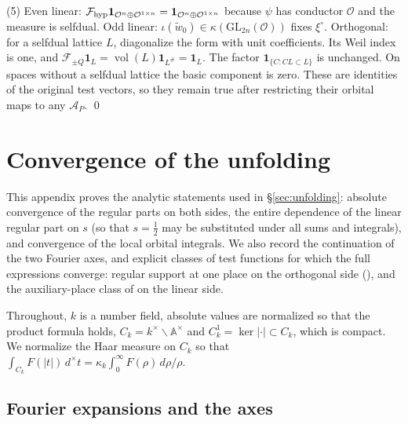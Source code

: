 \documentclass[11pt,oneside,notitlepage]{book}
\numberwithin{equation}{section}
\theoremstyle{plain}
\theoremstyle{definition}
\newcommand{\A}{\mathbb{A}}
\newcommand{\cO}{\mathcal{O}}
\newcommand{\GL}{\mathrm{GL}}
\newcommand{\vol}{\operatorname{vol}}
\newcommand{\one}{\mathbf{1}}
\begin{document}
(5) Even linear: $\mathcal F_{\rm hyp}\one_{\cO^n\oplus\cO^{1\times n}}=\one_{\cO^n\oplus\cO^{1\times n}}$ because $\psi$ has conductor $\cO$ and the measure is selfdual. Odd linear: $\iota(\tilde w_0)\in\kappa(\GL_{2n}(\cO))$ fixes $\xi^\circ$. Orthogonal: for a selfdual lattice $L$, diagonalize the form with unit coefficients. Its Weil index is one, and $\mathcal F_{\pm Q}\one_L=\vol(L)\one_{L^\#}=\one_L$. The factor $\one_{\{C:CL\subset L\}}$ is unchanged. On spaces without a selfdual lattice the basic component is zero. These are identities of the original test vectors, so they remain true after restricting their orbital maps to any $\mathcal A_P$. \qed


\appendix
\chapter{Convergence of the unfolding}\label{app:convergence}

This appendix proves the analytic statements used in \S\ref{sec:unfolding}: absolute convergence of the regular parts on both sides, the entire dependence of the linear regular part on $s$ (so that $s=\frac12$ may be substituted under all sums and integrals), and convergence of the local orbital integrals. We also record the continuation of the two Fourier axes, and explicit classes of test functions for which the full expressions converge: regular support at one place on the orthogonal side (), and the auxiliary-place class of  on the linear side.

Throughout, $k$ is a number field, absolute values are normalized so that the product formula holds, $C_k=k^\times\backslash\A^\times$ and $C_k^1=\ker|\cdot|\subset C_k$, which is compact. We normalize the Haar measure on $C_k$ so that $\int_{C_k}F(|t|)\,d^\times t=\kappa_k\int_0^\infty F(\rho)\,d\rho/\rho$.

\section{Fourier expansions and the axes}
\end{document}
